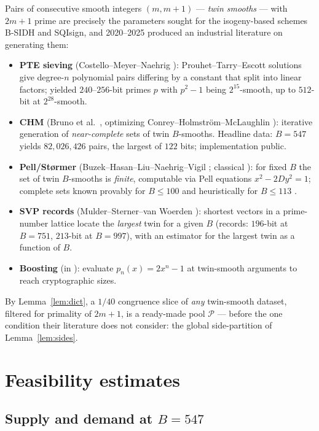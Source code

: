 \documentclass[11pt]{article}
\theoremstyle{remark}
\newcommand{\cP}{\mathcal{P}}
\begin{document}
Pairs of consecutive smooth integers $(m, m+1)$ --- \emph{twin smooths} ---
with $2m+1$ prime are precisely the parameters sought for the isogeny-based
schemes B-SIDH \cite{BSIDH} and SQIsign, and 2020--2025 produced an industrial
literature on generating them:

\begin{itemize}\itemsep2pt
\item \textbf{PTE sieving} (Costello--Meyer--Naehrig \cite{CMN21}):
Prouhet--Tarry--Escott solutions give degree-$n$ polynomial pairs differing by
a constant that split into linear factors; yielded $240$--$256$-bit primes $p$
with $p^2-1$ being $2^{15}$-smooth, up to $512$-bit at $2^{28}$-smooth.
\item \textbf{CHM} (Bruno et al.\ \cite{BCCEMNS23}, optimizing
Conrey--Holmstr\"om--McLaughlin \cite{CHM13}): iterative generation of
\emph{near-complete} sets of twin $B$-smooths. Headline data: $B = 547$ yields
$82{,}026{,}426$ pairs, the largest of $122$ bits; implementation public.
\item \textbf{Pell/St\o rmer} (Buzek--Hasan--Liu--Naehrig--Vigil \cite{BHLNV};
classical \cite{Stormer,Lehmer64}): for fixed $B$ the set of twin $B$-smooths
is \emph{finite}, computable via Pell equations $x^2 - 2Dy^2 = 1$; complete
sets known provably for $B \le 100$ and heuristically for $B \le 113$
\cite{MSW}.
\item \textbf{SVP records} (Mulder--Sterner--van Woerden \cite{MSW}): shortest
vectors in a prime-number lattice locate the \emph{largest} twin for a given
$B$ (records: $196$-bit at $B = 751$, $213$-bit at $B=997$), with an estimator
for the largest twin as a function of $B$.
\item \textbf{Boosting} (in \cite{BCCEMNS23,Sterner23}): evaluate
$p_n(x) = 2x^n - 1$ at twin-smooth arguments to reach cryptographic sizes.
\end{itemize}

By Lemma~\ref{lem:dict}, a $1/40$ congruence slice of \emph{any} twin-smooth
dataset, filtered for primality of $2m+1$, is a ready-made pool $\cP$ ---
before the one condition their literature does not consider: the global
side-partition of Lemma~\ref{lem:sides}.

\section{Feasibility estimates}\label{sec:feasibility}

\subsection{Supply and demand at $B = 547$}
\end{document}
